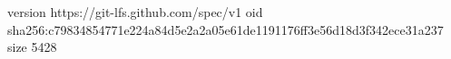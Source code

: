 version https://git-lfs.github.com/spec/v1
oid sha256:c79834854771e224a84d5e2a2a05e61de1191176ff3e56d18d3f342ece31a237
size 5428
